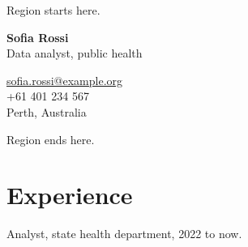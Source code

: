 \documentclass[10pt,a4paper]{article}
\begin{document}
Region starts here.

\begin{minipage}[t]{0.6\linewidth}
{\LARGE\bfseries Sofia Rossi}\\
Data analyst, public health
\end{minipage}\hfill
\begin{minipage}[t]{0.38\linewidth}
\raggedleft
\href{mailto:sofia.rossi@example.org}{sofia.rossi@example.org}\\
+61 401 234 567\\
Perth, Australia
\end{minipage}

Region ends here.

\section{Experience}
Analyst, state health department, 2022 to now.
\end{document}
